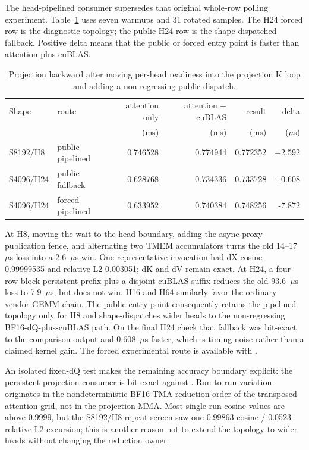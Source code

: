 The head-pipelined consumer supersedes that original whole-row polling
experiment.  Table~\ref{tab:head-pipelined-projection} uses seven warmups
and 31 rotated samples.  The H24 forced row is the diagnostic topology; the
public H24 row is the shape-dispatched fallback.  Positive delta means that
the public or forced entry point is faster than attention plus cuBLAS.

\begin{table}[htbp]
\centering
\caption{Projection backward after moving per-head readiness into the
projection K loop and adding a non-regressing public dispatch.}
\label{tab:head-pipelined-projection}
\small
\begin{tabular}{l l rrrr}
\toprule
Shape & route & attention only & attention + cuBLAS & result & delta \\
 & & (ms) & (ms) & (ms) & ($\mu$s) \\
\midrule
S8192/H8  & public pipelined & 0.746528 & 0.774944 & 0.772352 & +2.592 \\
S4096/H24 & public fallback  & 0.628768 & 0.734336 & 0.733728 & +0.608 \\
S4096/H24 & forced pipelined & 0.633952 & 0.740384 & 0.748256 & -7.872 \\
\bottomrule
\end{tabular}
\end{table}

At H8, moving the wait to the head boundary, adding the async-proxy
publication fence, and alternating two TMEM accumulators turns the old
14--17~$\mu$s loss into a 2.6~$\mu$s win.  One representative invocation had
dX cosine 0.99999535 and relative L2 0.003051; dK and dV remain exact.  At
H24, a four-row-block persistent prefix plus a disjoint cuBLAS suffix reduces
the old 93.6~$\mu$s loss to 7.9~$\mu$s, but does not win.  H16 and H64
similarly favor the ordinary vendor-GEMM chain.  The public entry point
consequently retains the pipelined topology only for H8 and shape-dispatches
wider heads to the non-regressing BF16-dQ-plus-cuBLAS path.  On the final H24
check that fallback was bit-exact to the comparison output and 0.608~$\mu$s
faster, which is timing noise rather than a claimed kernel gain.  The forced
experimental route is available with
.

An isolated fixed-dQ test makes the remaining accuracy boundary explicit:
the persistent projection consumer is bit-exact against .
Run-to-run variation originates in the nondeterministic BF16 TMA reduction
order of the transposed attention grid, not in the projection MMA.  Most
single-run cosine values are above 0.9999, but the S8192/H8 repeat screen saw
one 0.99863 cosine / 0.0523 relative-L2 excursion; this is another reason not
to extend the topology to wider heads without changing the reduction owner.


